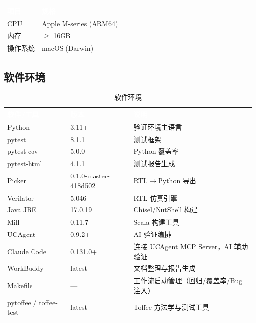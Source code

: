 \documentclass[12pt,a4paper]{ctexart}
\newcommand{\thcell}[1]{\textcolor{white}{\bfseries #1}}
\begin{document}
\begin{table}[H]
\centering
\renewcommand{\arraystretch}{1.3}
\begin{tabular}{@{}p{3cm}p{8cm}@{}}
\toprule
\rowcolor{primaryblue}
\thcell{项目} & \thcell{规格} \\
\midrule
\rowcolor{rowgray} CPU & Apple M-series (ARM64) \\
内存 & $\ge$ 16GB \\
\rowcolor{rowgray} 操作系统 & macOS (Darwin) \\
\bottomrule
\end{tabular}
\end{table}

\subsection{软件环境}

\begin{table}[H]
\centering
\caption{软件环境}
\renewcommand{\arraystretch}{1.3}
\begin{tabular}{@{}p{3.5cm}p{3.5cm}p{5cm}@{}}
\toprule
\rowcolor{primaryblue}
\thcell{软件/工具} & \thcell{版本} & \thcell{说明} \\
\midrule
\rowcolor{rowgray} Python & 3.11+ & 验证环境主语言 \\
pytest & 8.1.1 & 测试框架 \\
\rowcolor{rowgray} pytest-cov & 5.0.0 & Python 覆盖率 \\
pytest-html & 4.1.1 & 测试报告生成 \\
\rowcolor{rowgray} Picker & 0.1.0-master-418d502 & RTL$\rightarrow$Python 导出 \\
Verilator & 5.046 & RTL 仿真引擎 \\
\rowcolor{rowgray} Java JRE & 17.0.19 & Chisel/NutShell 构建 \\
Mill & 0.11.7 & Scala 构建工具 \\
\rowcolor{rowgray} UCAgent & 0.9.2+ & AI 验证编排 \\
Claude Code & 0.131.0+ & 连接 UCAgent MCP Server，AI 辅助验证 \\
\rowcolor{rowgray} WorkBuddy & latest & 文档整理与报告生成 \\
Makefile & --- & 工作流启动管理（回归/覆盖率/Bug 注入） \\
\rowcolor{rowgray} pytoffee / toffee-test & latest & Toffee 方法学与测试工具 \\
\bottomrule
\end{tabular}
\end{table}
\end{document}
